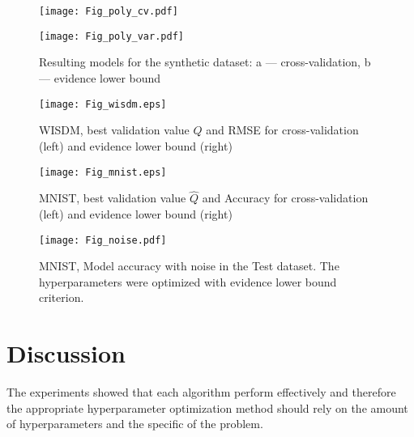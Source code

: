 \documentclass[smallextended]{svjour3}
\begin{document}
    \begin{figure*}

    \begin{subfloat}[]{
    \texttt{[image: Fig\_poly\_cv.pdf]}
    }
    \end{subfloat}
    \begin{subfloat}[]{
    \texttt{[image: Fig\_poly\_var.pdf]}
    }
    \end{subfloat}

 \caption{Resulting models for the synthetic dataset: a --- cross-validation, b --- evidence lower bound}
  \label{fig:poly}
   
    \end{figure*}




    \begin{figure*}

    \texttt{[image: Fig\_wisdm.eps]}
\caption{WISDM,  best validation value $\hat{Q}$ and RMSE  for cross-validation (left) and evidence lower bound (right)}    
\label{fig:wisdm}
    
    \end{figure*}


    \begin{figure*}

    \texttt{[image: Fig\_mnist.eps]}

    \caption{MNIST, best validation value  $\hat{Q}$ and Accuracy  for cross-validation (left) and evidence lower bound (right)}
    \label{fig:mnist}
    \end{figure*}

    \begin{figure*}

    \texttt{[image: Fig\_noise.pdf]}

    \caption{MNIST, Model accuracy with noise in the Test dataset. The hyperparameters were optimized with evidence lower bound criterion.}
    \label{fig:noise}
    \end{figure*}





\section{Discussion}
\label{discussion}
The experiments showed that each algorithm perform effectively and therefore the appropriate hyperparameter optimization method should rely on the amount of hyperparameters and the specific of the problem. 
\end{document}
